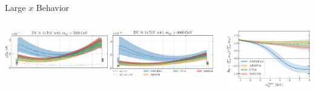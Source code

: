 \documentclass[9pt]{beamer}
\begin{document}
\begin{frame}{Large $x$ Behavior}
\begin{columns}
\begin{column}{0.5\textwidth}
            \begin{tcolorbox}
                \centering
                \includegraphics[width=0.49\textwidth]{NNPDF_DY_14TEV_BSM_AFB_COS_5000}
                \includegraphics[width=0.49\textwidth]{NNPDF_DY_14TEV_BSM_AFB_COS_6000}
            \end{tcolorbox}
        \end{column}
        \begin{column}{0.5\textwidth}
            \begin{tcolorbox}
                \includegraphics[width=\textwidth]{asym_coeff_mlldep}
            \end{tcolorbox}
        \end{column}
    \end{columns}
\end{frame}
\end{document}
